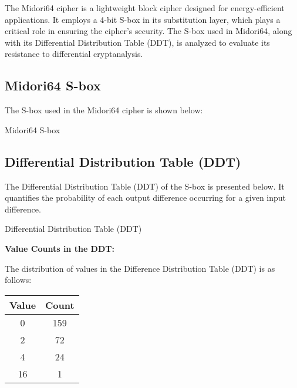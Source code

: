 
\noindent The Midori64 cipher is a lightweight block cipher designed for
energy-efficient applications. It employs a 4-bit S-box in its substitution
layer, which plays a critical role in ensuring the cipher's security. The S-box
used in Midori64, along with its Differential Distribution Table (DDT), is
analyzed to evaluate its resistance to differential cryptanalysis.

\subsection*{Midori64 S-box}
\noindent The S-box used in the Midori64 cipher is shown below:

\begin{table}[h!]
	\centering
	\setlength{\tabcolsep}{8pt}
	\renewcommand{\arraystretch}{1.5}
	\hspace{2pt}
	\caption{Midori64 S-box}
\end{table}

\subsection{Differential Distribution Table (DDT)}
\noindent The Differential Distribution Table (DDT) of the S-box is presented
below. It quantifies the probability of each output difference occurring for a
given input difference.

\begin{table}[h!]
	\centering
	\label{tab:ddt}
	\caption{Differential Distribution Table (DDT)}
	\setlength{\tabcolsep}{8pt}
	\hspace{2pt}
\end{table}

\newpage
\textbf{Value Counts in the DDT:}

The distribution of values in the Difference Distribution Table (DDT) is as follows:
\begin{table}[h!]
	\centering
	\setlength{\tabcolsep}{5pt}
	\begin{tabular}{|c|c|}
		\hline
		\textbf{Value} & \textbf{Count} \\ \hline
		0              & 159            \\ \hline
		2              & 72             \\ \hline
		4              & 24             \\ \hline
		16             & 1              \\ \hline
	\end{tabular}
\end{table}


